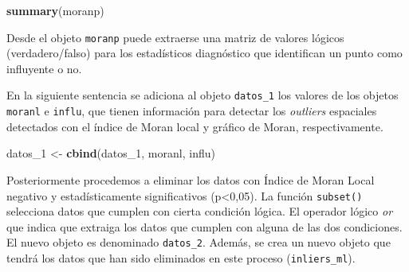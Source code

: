 \documentclass[11pt,b5paper,]{krantz}
\newenvironment{Shaded}{}{}
\newcommand{\CommentTok}[1]{\textcolor[rgb]{0.38,0.63,0.69}{\textit{#1}}}
\newcommand{\DecValTok}[1]{\textcolor[rgb]{0.25,0.63,0.44}{#1}}
\newcommand{\KeywordTok}[1]{\textcolor[rgb]{0.00,0.44,0.13}{\textbf{#1}}}
\newcommand{\NormalTok}[1]{#1}
\newcommand{\OperatorTok}[1]{\textcolor[rgb]{0.40,0.40,0.40}{#1}}
\newcommand{\StringTok}[1]{\textcolor[rgb]{0.25,0.44,0.63}{#1}}
\begin{document}
\begin{Shaded}
\begin{Highlighting}[]
\KeywordTok{summary}\NormalTok{(moranp)}
\end{Highlighting}
\end{Shaded}

Desde el objeto \texttt{moranp} puede extraerse una matriz de valores lógicos (verdadero/falso) para los estadísticos diagnóstico que identifican un punto como influyente o no.

\begin{Shaded}
\end{Shaded}

En la siguiente sentencia se adiciona al objeto \texttt{datos\_1} los valores de los objetos \texttt{moranl} e \texttt{influ}, que tienen información para detectar los \emph{outliers} espaciales detectados con el índice de Moran local y gráfico de Moran, respectivamente.

\begin{Shaded}
\begin{Highlighting}[]
\NormalTok{datos_}\DecValTok{1}\NormalTok{ <-}\StringTok{ }\KeywordTok{cbind}\NormalTok{(datos_}\DecValTok{1}\NormalTok{, moranl, influ)}
\end{Highlighting}
\end{Shaded}

Posteriormente procedemos a eliminar los datos con Índice de Moran Local negativo y estadísticamente significativos (p\textless{}0,05). La función \texttt{subset()} selecciona datos que cumplen con cierta condición lógica. El operador lógico \emph{or} que indica que extraiga los datos que cumplen con alguna de las dos condiciones. El nuevo objeto es denominado \texttt{datos\_2}. Además, se crea un nuevo objeto que tendrá los datos que han sido eliminados en este proceso (\texttt{inliers\_ml}).
\end{document}
